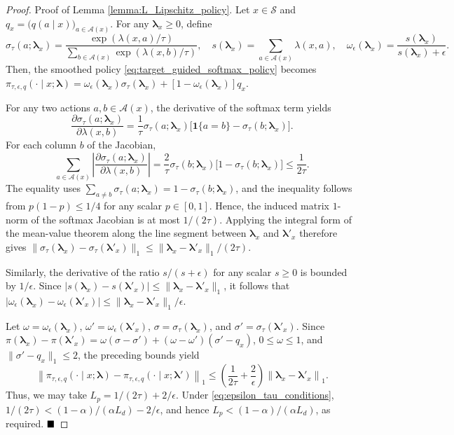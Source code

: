 \documentclass[sglanonrev]{informs4}
\providecommand{\blambda}{\boldsymbol{\lambda}}
\begin{document}
\begin{proof}{Proof of Lemma \ref{lemma:L_Lipschitz_policy}.}
Let $x\in\mathcal S$ and $q_x=\bigl(q(a\mid x)\bigr)_{a\in\mathcal A(x)}$. For any $\blambda_x \ge 0$, define
\begin{equation*}
\sigma_\tau(a;\blambda_x)
=
\frac{\exp\!\left(\lambda(x,a)/\tau\right)}
{\sum_{b\in\mathcal A(x)}\exp\!\left(\lambda(x,b)/\tau\right)},
\quad
s(\blambda_x)=\sum_{a\in\mathcal A(x)}\lambda(x,a),
\quad
\omega_\epsilon(\blambda_x)=\frac{s(\blambda_x)}{s(\blambda_x)+\epsilon}.
\end{equation*}
Then, the smoothed policy \eqref{eq:target_guided_softmax_policy} becomes
$\pi_{\tau,\epsilon,q}(\cdot\mid x;\blambda)
=\omega_\epsilon(\blambda_x)\sigma_\tau(\blambda_x)
+[1-\omega_\epsilon(\blambda_x)]q_x$.

For any two actions $a,b\in\mathcal A(x)$, the derivative of the softmax term yields
\begin{equation*}
\frac{\partial\sigma_\tau(a;\blambda_x)}
{\partial\lambda(x,b)}
=
\frac{1}{\tau}\sigma_\tau(a;\blambda_x)
\bigl[\mathbf 1\{a=b\}-\sigma_\tau(b;\blambda_x)\bigr].
\end{equation*}
For each column $b$ of the Jacobian,
\begin{equation*}
\sum_{a\in\mathcal A(x)}
\left|
\frac{\partial\sigma_\tau(a;\blambda_x)}
{\partial\lambda(x,b)}
\right|
=
\frac{2}{\tau}\sigma_\tau(b;\blambda_x)
\bigl[1-\sigma_\tau(b;\blambda_x)\bigr]
\leq
\frac{1}{2\tau}.
\end{equation*}
The equality uses
$\sum_{a\neq b}\sigma_\tau(a;\blambda_x)
=1-\sigma_\tau(b;\blambda_x)$, and the inequality follows from
$p(1-p)\leq1/4$ for any scalar $p\in[0,1]$. Hence, the induced matrix $1$-norm of
the softmax Jacobian is at most $1/(2\tau)$. Applying the integral form
of the mean-value theorem along the line segment between $\blambda_x$
and $\blambda'_x$ therefore gives
$\|\sigma_\tau(\blambda_x)-\sigma_\tau(\blambda'_x)\|_1
\leq\|\blambda_x-\blambda'_x\|_1/(2\tau)$.

Similarly, the derivative of the ratio $s/(s+\epsilon)$ for any scalar $s\geq0$ is bounded by
$1/\epsilon$. Since
$|s(\blambda_x)-s(\blambda'_x)|
\leq\|\blambda_x-\blambda'_x\|_1$, it follows that
$|\omega_\epsilon(\blambda_x)-\omega_\epsilon(\blambda'_x)|
\leq\|\blambda_x-\blambda'_x\|_1/\epsilon$.

Let $\omega=\omega_\epsilon(\blambda_x)$,
$\omega'=\omega_\epsilon(\blambda'_x)$,
$\sigma=\sigma_\tau(\blambda_x)$, and
$\sigma'=\sigma_\tau(\blambda'_x)$. Since
$\pi(\blambda_x)-\pi(\blambda'_x)
=\omega(\sigma-\sigma')+(\omega-\omega')(\sigma'-q_x)$,
$0\leq\omega\leq1$, and $\|\sigma'-q_x\|_1\leq2$, the preceding
bounds yield
\begin{equation*}
\left\|
\pi_{\tau,\epsilon,q}(\cdot\mid x;\blambda)
-\pi_{\tau,\epsilon,q}(\cdot\mid x;\blambda')
\right\|_1
\leq
\left(\frac{1}{2\tau}+\frac{2}{\epsilon}\right)
\left\|\blambda_x-\blambda'_x\right\|_1.
\end{equation*}
Thus, we may take $L_p=1/(2\tau)+2/\epsilon$. Under
\eqref{eq:epsilon_tau_conditions},
$1/(2\tau)< (1-\alpha)/(\alpha L_d)-2/\epsilon$, and hence
$L_p<(1-\alpha)/(\alpha L_d)$, as required.
$\hfill \blacksquare$
\end{proof}
\end{document}
